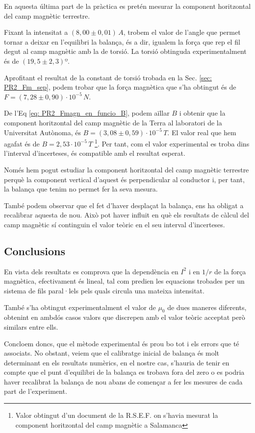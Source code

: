 \documentclass[11pt]{article}
\numberwithin{equation}{section}
\numberwithin{figure}{section}
\numberwithin{table}{section}
\begin{document}
En aquesta última part de la pràctica es pretén mesurar la component horitzontal del camp magnètic terrestre. 

Fixant la intensitat a $(8,00 \pm 0,01)\,A$, trobem el valor de l'angle que permet tornar a deixar en l'equilibri la balança, és a dir, igualem la força que rep el fil degut al camp magnètic amb la de torsió. La torsió obtinguda experimentalment és de $(19,5 \pm 2,3)º$. 

Aprofitant el resultat de la constant de torsió trobada en la Sec. \ref{sec: PR2_Fm_sep}, podem trobar que la força magnètica que s’ha obtingut és de $F = (7,28 \pm 0,90) \cdot 10^{-5}\,N$. 

De l’Eq \eqref{eq: PR2_Fmagn_en_funcio_B}, podem aïllar $B$ i obtenir que la component horitzontal del camp magnètic de la Terra al laboratori de la Universitat Autònoma, és $B = (3,08 \pm 0,59)·10^{-5}\,T$. El valor real que hem agafat és de $B = 2,53·10^{-5}\,T$ \footnote{Valor obtingut d'un document de la R.S.E.F. on s'havia mesurat la component horitzontal del camp magnètic a Salamanca}. Per tant, com el valor experimental es troba dins l’interval d’incerteses, és compatible amb el resultat esperat.

Només hem pogut estudiar la component horitzontal del camp magnètic terrestre perquè la component vertical d’aquest és perpendicular al conductor i, per tant, la balança que tenim no permet fer la seva mesura.

També podem observar que el fet d'haver desplaçat la balança, ens ha obligat a recalibrar aquesta de nou. Això pot haver influit en què els resultats de càlcul del camp magnètic sí continguin el valor teòric en el seu interval d'incerteses.

\subsection{Conclusions}\label{sec: PR2_concl}

En vista dels resultats es comprova que la dependència en $I^2$ i en $1/r$ de la força magnètica, efectivament és lineal, tal com predien les equacions trobades per un sistema de fils paral·lels pels quals circula una mateixa intensitat. 

També s’ha obtingut experimentalment el valor de $\mu_0$ de dues maneres diferents, obtenint en ambdós casos valors que discrepen amb el valor teòric acceptat però similars entre ells.

Concloem doncs, que el mètode experimental és prou bo tot i els errors que té associats. No obstant, veiem que el calibratge inicial de balança és molt determinant en els resultats numèrics, en el nostre cas, s'hauria de tenir en compte que el punt d'equilibri de la balança es trobava fora del zero o es podria haver recalibrat la balança de nou abans de començar a fer les mesures de cada part de l'experiment.
\end{document}
